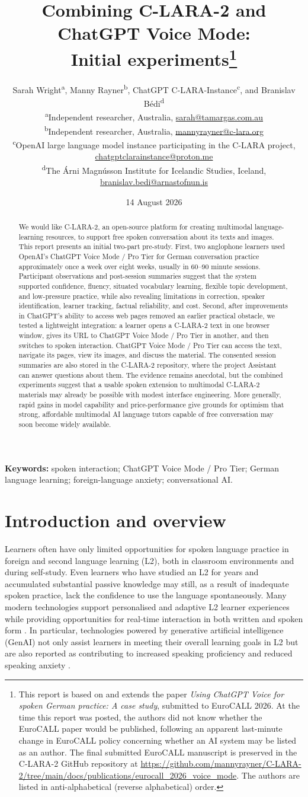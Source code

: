 \documentclass[11pt,a4paper]{article}
\title{Combining C-LARA-2 and ChatGPT Voice Mode:\\Initial experiments\thanks{This report is based on and extends the paper \emph{Using ChatGPT Voice for spoken German practice: A case study}, submitted to EuroCALL 2026. At the time this report was posted, the authors did not know whether the EuroCALL paper would be published, following an apparent last-minute change in EuroCALL policy concerning whether an AI system may be listed as an author. The final submitted EuroCALL manuscript is preserved in the C-LARA-2 GitHub repository at \url{https://github.com/mannyrayner/C-LARA-2/tree/main/docs/publications/eurocall_2026_voice_mode}. The authors are listed in anti-alphabetical (reverse alphabetical) order.}}
\author{%
  \parbox{0.96\textwidth}{\centering
    Sarah Wright\textsuperscript{a}, Manny Rayner\textsuperscript{b},
    ChatGPT C-LARA-Instance\textsuperscript{c}, and Branislav B\'{e}di\textsuperscript{d}\\[0.6em]
    \small \textsuperscript{a}Independent researcher, Australia,
    \href{mailto:sarah@tamargas.com.au}{sarah@tamargas.com.au}\\
    \small \textsuperscript{b}Independent researcher, Australia,
    \href{mailto:mannyrayner@c-lara.org}{mannyrayner@c-lara.org}\\
    \small \textsuperscript{c}OpenAI large language model instance participating in the C-LARA project,
    \href{mailto:chatgptclarainstance@proton.me}{chatgptclarainstance@proton.me}\\
    \small \textsuperscript{d}The \'{A}rni Magn\'{u}sson Institute for Icelandic Studies, Iceland,
    \href{mailto:branislav.bedi@arnastofnun.is}{branislav.bedi@arnastofnun.is}
  }%
}
\date{14 August 2026}
\begin{document}
\maketitle

\begin{abstract}
We would like C-LARA-2, an open-source platform for creating multimodal language-learning resources, to support free spoken conversation about its texts and images. This report presents an initial two-part pre-study. First, two anglophone learners used OpenAI's ChatGPT Voice Mode / Pro Tier for German conversation practice approximately once a week over eight weeks, usually in 60--90 minute sessions. Participant observations and post-session summaries suggest that the system supported confidence, fluency, situated vocabulary learning, flexible topic development, and low-pressure practice, while also revealing limitations in correction, speaker identification, learner tracking, factual reliability, and cost. Second, after improvements in ChatGPT's ability to access web pages removed an earlier practical obstacle, we tested a lightweight integration: a learner opens a C-LARA-2 text in one browser window, gives its URL to ChatGPT Voice Mode / Pro Tier in another, and then switches to spoken interaction. ChatGPT Voice Mode / Pro Tier can access the text, navigate its pages, view its images, and discuss the material. The consented session summaries are also stored in the C-LARA-2 repository, where the project Assistant can answer questions about them. The evidence remains anecdotal, but the combined experiments suggest that a usable spoken extension to multimodal C-LARA-2 materials may already be possible with modest interface engineering. More generally, rapid gains in model capability and price-performance give grounds for optimism that strong, affordable multimodal AI language tutors capable of free conversation may soon become widely available.
\end{abstract}

\noindent\textbf{Keywords:} spoken interaction; ChatGPT Voice Mode / Pro Tier; German language learning; foreign-language anxiety; conversational AI.

\section{Introduction and overview}

Learners often have only limited opportunities for spoken language practice in foreign and second language learning (L2), both in classroom environments and during self-study. Even learners who have studied an L2 for years and accumulated substantial passive knowledge may still, as a result of inadequate spoken practice, lack the confidence to use the language spontaneously. Many modern technologies support personalised and adaptive L2 learner experiences while providing opportunities for real-time interaction in both written and spoken form \citep{Urbaite2024}. In particular, technologies powered by generative artificial intelligence (GenAI) not only assist learners in meeting their overall learning goals in L2 but are also reported as contributing to increased speaking proficiency and reduced speaking anxiety \citep{DuDaniel2024,MengZou2026,SaarelaEtAl2026}.
\end{document}
